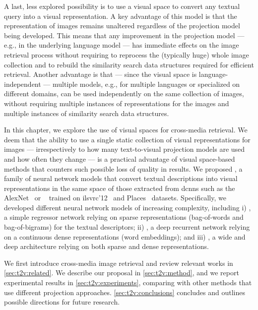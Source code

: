 A last, less explored possibility is to use a visual space to convert any textual query into a visual representation.
A key advantage of this model is that the representation of images remains unaltered regardless of the projection model being developed.
This means that any improvement in the projection model --- e.g., in the underlying language model --- has immediate effects on the image retrieval process without requiring to reprocess the (typically huge) whole image collection and to rebuild the similarity search data structures required for efficient retrieval.
Another advantage is that --- since the visual space is language-independent --- multiple models, e.g., for multiple languages or specialized on different domains, can be used independently on the same collection of images, without requiring multiple instances of representations for the images and multiple instances of similarity search data structures.

In this chapter, we explore the use of visual spaces for cross-media retrieval.
We deem that the ability to use a single static collection of visual representations for images --- irrespectively to how many text-to-visual projection models are used and how often they change --- is a practical advantage of visual space-based methods that counters such possible loss of quality in results.
%
We proposed \ttv{}, a family of neural network models that convert textual descriptions into visual representations in the same space of those extracted from \glspl{dcnn} such as the AlexNet~\cite{krizhevsky2012imagenet} or \resnet{}~\cite{he2016deep} trained on \gls{ilsvrc}'12~\cite{russakovsky2015imagenet} and Places~\cite{zhou2014learning} datasets.
Specifically, we developed different neural network models of increasing complexity, including %
i) \sparsettv{}, a simple regressor network relying on sparse representations (bag-of-words and bag-of-bigrams) for the textual descriptors; %
ii) \densettv{}, a deep recurrent network relying on a continuous dense representations (word embeddings); and %
iii) \widedeepttv{}, a wide and deep architecture relying on both sparse and dense representations.

We first introduce cross-media image retrieval and review relevant works in \ref{sec:t2v:related}.
We describe our proposal in \ref{sec:t2v:method}, and we report experimental results in \ref{sec:t2v:experiments}, comparing with other methods that use different projection approaches.
\ref{sec:t2v:conclusions} concludes and outlines possible directions for future research.

